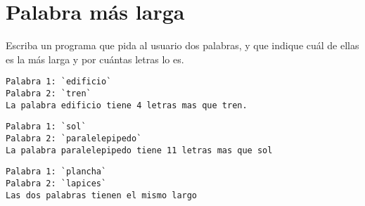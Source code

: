 \section{Palabra más larga}

Escriba un programa que pida al usuario dos palabras, y que indique cuál
de ellas es la más larga y por cuántas letras lo es.

\begin{lstlisting}[language=testcase]
Palabra 1: `edificio`
Palabra 2: `tren`
La palabra edificio tiene 4 letras mas que tren.
\end{lstlisting}

\begin{lstlisting}[language=testcase]
Palabra 1: `sol`
Palabra 2: `paralelepipedo`
La palabra paralelepipedo tiene 11 letras mas que sol
\end{lstlisting}

\begin{lstlisting}[language=testcase]
Palabra 1: `plancha`
Palabra 2: `lapices`
Las dos palabras tienen el mismo largo
\end{lstlisting}


